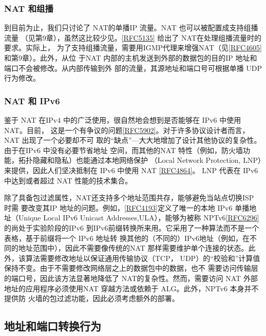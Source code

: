\subsubsection{ NAT 和组播}

到目前为止，我们只讨论了 NAT的单播IP 流量。NAT 也可以被配置成支持组播流量
（见第9章），虽然这比较少见。\href{https://www.rfc-editor.org/rfc/rfc5135}{[RFC5135]} 给出了 NAT在处理组播流量时的要求。实际上，
为了支持组播流量，需要用IGMP代理来增强NAT（见\href{https://www.rfc-editor.org/rfc/rfc4605}{[RFC4605]}和第9章）。此外，从位
于NAT 内部的主机发送到外部的数据包的目的IP 地址和端口不会被修改。从内部传输到外
部的流量，其源地址和端口号可根据单播 UDP 行为修改。

\subsubsection{NAT 和 IPv6}

鉴于 NAT 在IPv4 中的广泛使用，很自然地会想到是否能够在 IPv6 中使用 NAT。目前，
这是一个有争议的问题\href{https://www.rfc-editor.org/rfc/rfc5902}{[RFC5902]}。对于许多协议设计者而言，NAT 出现了一个必要却不可
取的“缺点”—大大地增加了设计其他协议的复杂性。由于在IPv6 中没有必要节省地址
空间，而其他的NAT 特性（例如，防火墙功能，拓扑隐藏和隐私）也能通过本地网络保护
（Local Network Protection, LNP）来提供，因此人们坚决抵制在 IPv6 中使用 NAT \href{https://www.rfc-editor.org/rfc/rfc4864}{[RFC4864]}。
LNP 代表在 IPv6 中达到或者超过 NAT 性能的技术集合。

除了具备包过滤属性，NAT还支持多个地址范围共存，能够避免当站点切换ISP 时需
要改变其IP 地址的问题。例如，\href{https://www.rfc-editor.org/rfc/rfc4193}{[RFC4193]}定义了唯一的本地 IPv6 单播地址（Unique Local
IPv6 Unicast Addresses,ULA），能够为被称 NPTv6\href{https://www.rfc-editor.org/rfc/rfc6296}{[RFC6296]}的尚处于实验阶段的IPv6
到IPv6前缀转换所来用。它采用了一种算法而不是一个表格，基于前缀将一个 IPv6 地址转
换其他的（不同的）IPv6地址（例如，在不同的地址范围中），因此不需要像传统的NAT
那样需要维护单个连接的状态。此外，该算法需要修改地址以保证通用传输协议（TCP，
UDP）的“校验和”计算值保持不变。由于不需要修改网络层之上的数据包中的数据，也不
需要访问传输层的端口号，因此该方法显著地降低了 NAT的复杂性。然而，需要访问 NAT
外部地址的应用程序必须使用NAT 穿越方法或依赖于 ALG。此外，NPTv6 本身并不提供防
火墙的包过滤功能，因此必须考虑额外的部署。

\subsection{地址和端口转换行为}

